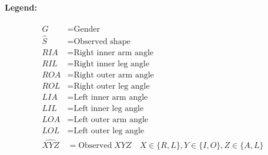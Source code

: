 \documentclass[11pt]{article}
\begin{document}
\begin{question}
{		\paragraph{Legend:}
		\begin{align*}
			G &= \text{Gender} \\
			\hat S &= \text{Observed shape} \\
			RIA &= \text{Right inner arm angle} \\
			RIL &= \text{Right inner leg angle} \\
			ROA &= \text{Right outer arm angle} \\
			ROL &= \text{Right outer leg angle} \\
			LIA &= \text{Left inner arm angle} \\
			LIL &= \text{Left inner leg angle} \\
			LOA &= \text{Left outer arm angle} \\
			LOL &= \text{Left outer leg angle} \\
			\widehat {XYZ} &= \text{Observed} \; XYZ  \quad X \in \{R, L\}, Y \in \{I, O\}, Z \in \{A, L\}
		\end{align*}
		}		  
\end{question}
\end{document}
